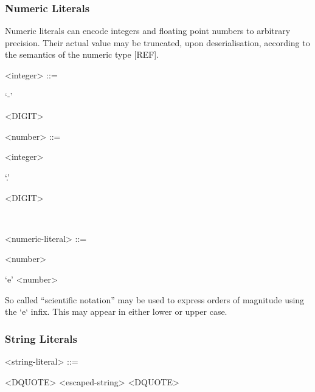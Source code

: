 \subsubsection{Numeric Literals}

Numeric literals can encode integers and floating point numbers to
arbitrary precision. Their actual value may be truncated, upon
deserialisation, according to the semantics of the numeric type [REF].

\begin{grammar}
  <integer> ::= \begin{syntdiag}
    \begin{stack}
      `-' \\
    \end{stack}
    \begin{rep}
      <DIGIT>
    \end{rep}
  \end{syntdiag}

  <number> ::= \begin{syntdiag}
    <integer>
    \begin{stack}
      `.' \begin{rep}<DIGIT>\end{rep} \\
    \end{stack}
  \end{syntdiag}

  <numeric-literal> ::= \begin{syntdiag}
    <number>
    \begin{stack}
      `e' <number> \\
    \end{stack}
  \end{syntdiag}
\end{grammar}

So called ``scientific notation'' may be used to express orders of
magnitude using the `e` infix. This may appear in either lower or upper
case.

\subsubsection{String Literals}

\begin{grammar}
  <string-literal> ::= \begin{syntdiag}
    <DQUOTE>
    <escaped-string>
    <DQUOTE>
  \end{syntdiag}
\end{grammar}

